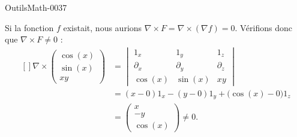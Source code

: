
\begin{corrige}{OutilsMath-0037}

    Si la fonction $f$ existait, nous aurions $\nabla\times F=\nabla\times(\nabla f)=0$. Vérifions donc que $\nabla\times F\neq 0$ :
    \begin{equation}
        \begin{aligned}[]
            \nabla\times\begin{pmatrix}
                \cos(x)    \\ 
                \sin(x)    \\ 
                xy    
            \end{pmatrix}&=
            \begin{vmatrix}
                1_x    &   1_y    &   1_z    \\
                \partial_x    &   \partial_y    &    \partial_z    \\
                \cos(x)    &   \sin(x)    &   xy
            \end{vmatrix}\\
            &=(x-0)1_x-(y-0)1_y+\big( \cos(x)-0 \big)1_z\\
            &=\begin{pmatrix}
                x    \\ 
                -y    \\ 
                \cos(x)    
            \end{pmatrix}\neq 0.
        \end{aligned}
    \end{equation}
    
\end{corrige}
